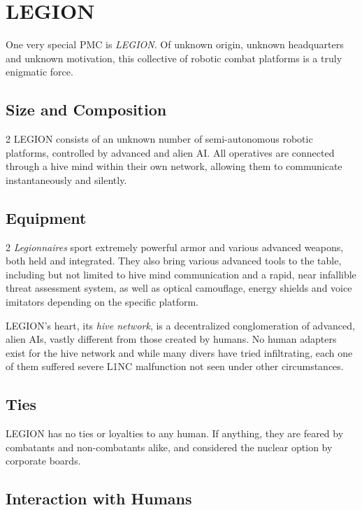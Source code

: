 \section{LEGION}
One very special PMC is \emph{LEGION}.
Of unknown origin, unknown headquarters and unknown motivation, this collective of robotic combat platforms is a truly enigmatic force.
\subsection*{Size and Composition}
\vspace{5mm}
\begin{multicols}{2}
LEGION consists of an unknown number of semi-autonomous robotic platforms, controlled by advanced and alien AI.
All operatives are connected through a hive mind within their own network, allowing them to communicate instantaneously and silently.
\end{multicols}
\subsection*{Equipment}
\vspace{5mm}
\begin{multicols}{2}
\emph{Legionnaires} sport extremely powerful armor and various advanced weapons, both held and integrated.
They also bring various advanced tools to the table, including but not limited to hive mind communication and a rapid, near infallible threat assessment system, as well as optical camouflage, energy shields and voice imitators depending on the specific platform.
\par
LEGION's heart, its \emph{hive network}, is a decentralized conglomeration of advanced, alien AIs, vastly different from those created by humans.
No human adapters exist for the hive network and while many divers have tried infiltrating, each one of them suffered severe L1NC malfunction not seen under other circumstances.
\end{multicols}
\subsection*{Ties}
LEGION has no ties or loyalties to any human.
If anything, they are feared by combatants and non-combatants alike,
and considered the nuclear option by corporate boards.
\subsection*{Interaction with Humans}
